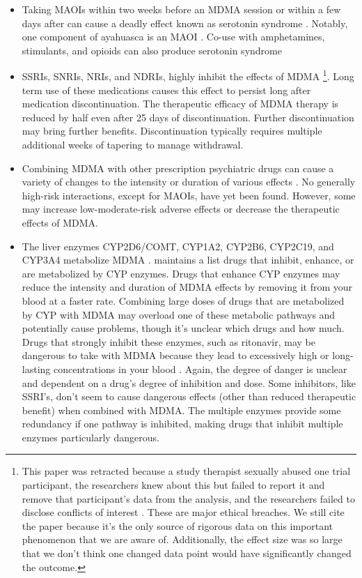 \documentclass[12pt,letterpaper]{book}
\begin{document}
\begin{itemize}
    \item Taking MAOIs within two weeks before an MDMA session or within a few days after can cause a deadly effect known as serotonin syndrome \cite{malcolmSerotonin,edinoffInteractions}. Notably, one component of ayahuasca is an MAOI \cite{ruffell2020pharmacological}. Co-use with amphetamines, stimulants, and opioids can also produce serotonin syndrome \cite{makunts2022reported}
    \item SSRIs, SNRIs, NRIs, and NDRIs, highly inhibit the effects of MDMA \cite{feducciaSSRIDiscontinuation}\footnote{\label{ssriRetraction}This paper was retracted because a study therapist sexually abused one trial participant, the researchers knew about this but failed to report it and remove that participant's data from the analysis, and the researchers failed to disclose conflicts of interest \cite{feduccia2024retraction,nytimesRetraction}. These are major ethical breaches. We still cite the paper because it's the only source of rigorous data on this important phenomenon that we are aware of. Additionally, the effect size was so large that we don't think one changed data point would have significantly changed the outcome.}. Long term use of these medications causes this effect to persist long after medication discontinuation. The therapeutic efficacy of MDMA therapy is reduced by half even after 25 days of discontinuation. Further discontinuation may bring further benefits. Discontinuation typically requires multiple additional weeks of tapering to manage withdrawal.
    \item Combining MDMA with other prescription psychiatric drugs can cause a variety of changes to the intensity or duration of various effects \cite{sarparastDrugInteractions}. No generally high-risk interactions, except for MAOIs, have yet been found. However, some may increase low-moderate-risk adverse effects or decrease the therapeutic effects of MDMA.
    \item The liver enzymes CYP2D6/COMT, CYP1A2, CYP2B6, CYP2C19, and CYP3A4 metabolize MDMA \cite{torreEnzymes,sarparastDrugInteractions}. \textcite{flockartTable} maintains a list drugs that inhibit, enhance, or are metabolized by CYP enzymes. Drugs that enhance CYP enzymes may reduce the intensity and duration of MDMA effects by removing it from your blood at a faster rate. Combining large doses of drugs that are metabolized by CYP with MDMA may overload one of these metabolic pathways and potentially cause problems, though it's unclear which drugs and how much. Drugs that strongly inhibit these enzymes, such as ritonavir, may be dangerous to take with MDMA because they lead to excessively high or long-lasting concentrations in your blood \cite{sarparastDrugInteractions}. Again, the degree of danger is unclear and dependent on a drug's degree of inhibition and dose. Some inhibitors, like SSRI's, don't seem to cause dangerous effects (other than reduced therapeutic benefit) when combined with MDMA. The multiple enzymes provide some redundancy if one pathway is inhibited, making drugs that inhibit multiple enzymes particularly dangerous.

\end{itemize}
\end{document}
